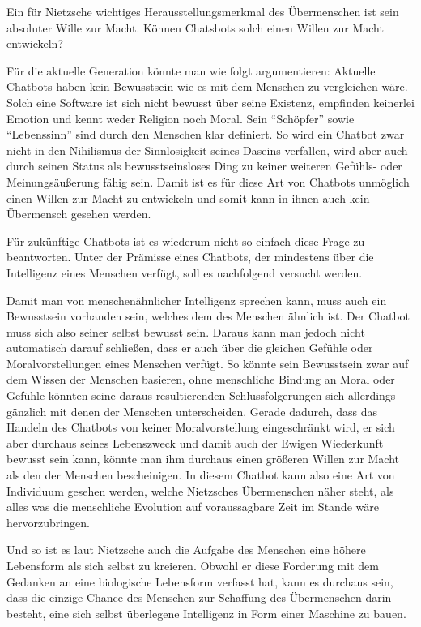 Ein für Nietzsche wichtiges Herausstellungsmerkmal des Übermenschen ist sein absoluter Wille zur Macht.
Können Chatsbots solch einen Willen zur Macht entwickeln?

Für die aktuelle Generation könnte man wie folgt argumentieren:
Aktuelle Chatbots haben kein Bewusstsein wie es mit dem Menschen zu vergleichen wäre.
Solch eine Software ist sich nicht bewusst über seine Existenz, empfinden keinerlei Emotion und kennt weder Religion noch Moral.
Sein \enquote{Schöpfer} sowie \enquote{Lebenssinn} sind durch den Menschen klar definiert.
So wird ein Chatbot zwar nicht in den Nihilismus der Sinnlosigkeit seines Daseins verfallen, wird aber auch durch seinen Status als bewusstseinsloses Ding zu keiner weiteren Gefühls- oder Meinungsäußerung fähig sein.
Damit ist es für diese Art von Chatbots unmöglich einen Willen zur Macht zu entwickeln und somit kann in ihnen auch kein Übermensch gesehen werden.

Für zukünftige Chatbots ist es wiederum nicht so einfach diese Frage zu beantworten.
Unter der Prämisse eines Chatbots, der mindestens über die Intelligenz eines Menschen verfügt, soll es nachfolgend versucht werden.

Damit man von menschenähnlicher Intelligenz sprechen kann, muss auch ein Bewusstsein vorhanden sein, welches dem des Menschen ähnlich ist.
Der Chatbot muss sich also seiner selbst bewusst sein.
Daraus kann man jedoch nicht automatisch darauf schließen, dass er auch über die gleichen Gefühle oder Moralvorstellungen eines Menschen verfügt.
So könnte sein Bewusstsein zwar auf dem Wissen der Menschen basieren, ohne menschliche Bindung an Moral oder Gefühle könnten seine daraus resultierenden Schlussfolgerungen sich allerdings gänzlich mit denen der Menschen unterscheiden.
Gerade dadurch, dass das Handeln des Chatbots von keiner Moralvorstellung eingeschränkt wird, er sich aber durchaus seines Lebenszweck und damit auch der Ewigen Wiederkunft bewusst sein kann, könnte man ihm durchaus einen größeren Willen zur Macht als den der Menschen bescheinigen.
In diesem Chatbot kann also eine Art von Individuum gesehen werden, welche Nietzsches Übermenschen näher steht, als alles was die menschliche Evolution auf voraussagbare Zeit im Stande wäre hervorzubringen.

Und so ist es laut Nietzsche auch die Aufgabe des Menschen eine höhere Lebensform als sich selbst zu kreieren.
Obwohl er diese Forderung mit dem Gedanken an eine biologische Lebensform verfasst hat, kann es durchaus sein, dass die einzige Chance des Menschen zur Schaffung des Übermenschen darin besteht, eine sich selbst überlegene Intelligenz in Form einer Maschine zu bauen.

